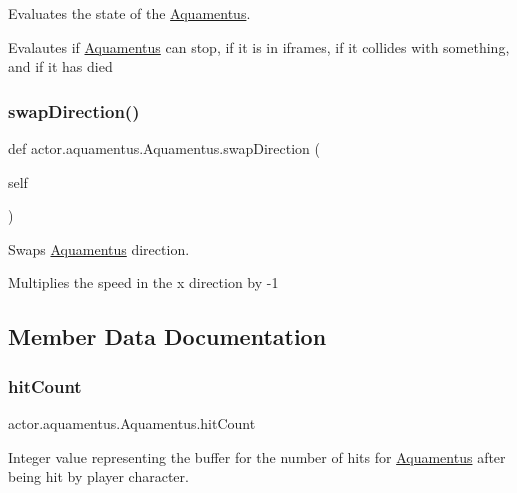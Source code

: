 Evaluates the state of the \hyperlink{classactor_1_1aquamentus_1_1_aquamentus}{Aquamentus}. 

Evalautes if \hyperlink{classactor_1_1aquamentus_1_1_aquamentus}{Aquamentus} can stop, if it is in iframes, if it collides with something, and if it has died \mbox{\label{classactor_1_1aquamentus_1_1_aquamentus_a63dc79ec42118be2c34462ea5fdcbade}} 
\subsubsection{\texorpdfstring{swap\+Direction()}{swapDirection()}}
{\footnotesize\ttfamily def actor.\+aquamentus.\+Aquamentus.\+swap\+Direction (\begin{DoxyParamCaption}\item[{}]{self }\end{DoxyParamCaption})}



Swaps \hyperlink{classactor_1_1aquamentus_1_1_aquamentus}{Aquamentus}\textquotesingle{} direction. 

Multiplies the speed in the x direction by -\/1 

\subsection{Member Data Documentation}
\mbox{\label{classactor_1_1aquamentus_1_1_aquamentus_ade0294266872c152be5a7ae1c1b14fc6}} 
\subsubsection{\texorpdfstring{hit\+Count}{hitCount}}
{\footnotesize\ttfamily actor.\+aquamentus.\+Aquamentus.\+hit\+Count}



Integer value representing the buffer for the number of hits for \hyperlink{classactor_1_1aquamentus_1_1_aquamentus}{Aquamentus} after being hit by player character. 

